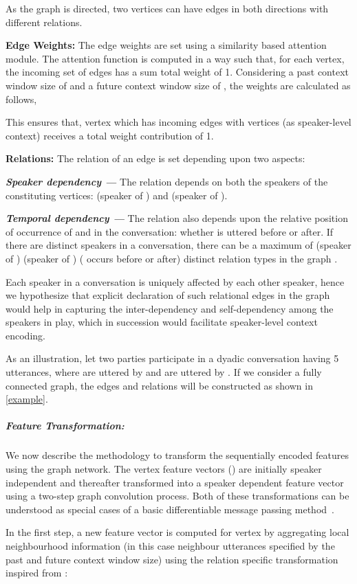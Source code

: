 \documentclass[11pt,a4paper]{article}
\begin{document}
  As the graph is directed, two vertices can have edges in both directions with different relations. 


  \textbf{Edge Weights:} 
  The edge weights are set using a similarity based attention module. The attention function is computed in a way such that, for each vertex, the incoming set of edges has a sum total weight of 1. Considering a past context window size of  and a future context window size of , the weights are calculated as follows,
  
  This ensures that, vertex  which has incoming edges with vertices  (as speaker-level context) receives a total weight contribution of 1. 

  
  \textbf{Relations:} The relation  of an edge  is set depending upon two aspects:
  
      \textbf{\textit{Speaker dependency --- }} The relation depends on both the speakers of the constituting vertices:  (speaker of ) and  (speaker of ).
      
      \textbf{\textit{Temporal dependency --- }} The relation also depends upon the relative position of occurrence of  and  in the conversation: whether  is uttered before  or after.
  If there are  distinct speakers in a conversation, there can be a maximum of  (speaker of )  (speaker of )  ( occurs before  or after)  distinct relation types  in the graph .
  
  Each speaker in a conversation is uniquely affected by each other speaker, hence we hypothesize that explicit declaration of such relational edges in the graph would help in capturing the inter-dependency and self-dependency among the speakers in play, which in succession would facilitate speaker-level context encoding. 
  
  As an illustration, let two parties  participate in a dyadic conversation having 5 utterances, where  are uttered by  and  are uttered by . 
  If we consider a fully connected graph, the edges and relations will be constructed as shown in \cref{example}.
\subparagraph{Feature Transformation:}
We now describe the methodology to transform the sequentially encoded features using the graph network. 
The vertex feature vectors () are initially speaker independent and thereafter transformed into a speaker dependent feature vector using a two-step graph convolution process. 
Both of these transformations can be understood as special cases of a basic differentiable message passing method~\cite{gilmer2017neural}.

In the first step, a new feature vector  is computed for vertex  by aggregating local neighbourhood information (in this case neighbour utterances specified by the past and future context window size) using the relation specific transformation inspired from \cite{schlichtkrull2018modeling}:
\end{document}
